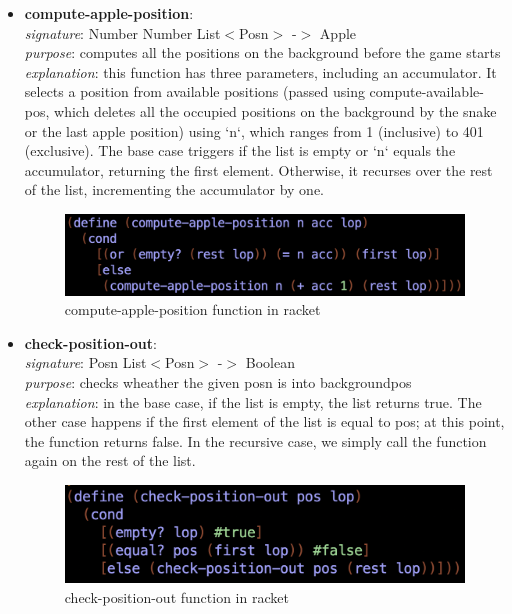 \documentclass{article}
\begin{document}
\begin{itemize}
		\item \textbf{compute-apple-position}: \\
			\emph{signature}: Number Number List$<$Posn$>$ -$>$ Apple \\
			\emph{purpose}: computes all the positions on the background before the game starts \\
			\emph{explanation}: this function has three parameters, including an accumulator. It selects a position from available positions (passed using compute-available-pos, which deletes all the occupied positions on the background by the snake or the last apple position) using `n`, which ranges from 1 (inclusive) to 401 (exclusive). The base case triggers if the list is empty or `n` equals the accumulator, returning the first element. Otherwise, it recurses over the rest of the list, incrementing the accumulator by one.
			\begin{figure}[h!]
				\centering
				\includegraphics[width=.6\linewidth]{compute-apple-position.png}
				\caption{compute-apple-position function in racket}
			\end{figure}
			
		\item \textbf{check-position-out}: \\
			\emph{signature}: Posn List$<$Posn$>$ -$>$ Boolean \\
			\emph{purpose}: checks wheather the given posn is into backgroundpos \\
			\emph{explanation}: in the base case, if the list is empty, the list returns true. 
							The other case happens if the first element of the list is equal to pos; at this point, the function returns 								false.
							In the recursive case, we simply call the function again on the rest of the list.
			\begin{figure}[h!]
				\centering
				\includegraphics[width=.6\linewidth]{check-position-out.png}
				\caption{check-position-out function in racket}
			\end{figure}
			

\end{itemize}
\end{document}
